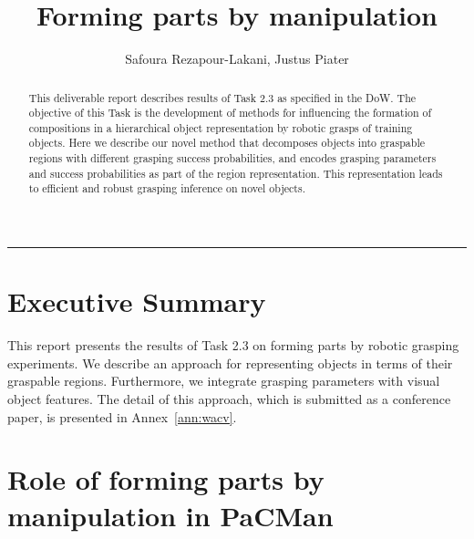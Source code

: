 \documentclass[a4paper,11pt,pdf]{pacmanreport}
\title{Forming parts by manipulation}
\author{Safoura Rezapour-Lakani, Justus Piater}
\begin{document}
\maketitle

\begin{abstract}
\noindent 
This deliverable report describes results of Task 2.3 as specified in
the DoW.  The objective of this Task is the development of methods for
influencing the formation of compositions in a hierarchical object
representation by robotic grasps of training objects.  Here we
describe our novel method that decomposes objects into graspable
regions with different grasping success probabilities,
and encodes grasping parameters and success probabilities as part of
the region representation. This representation leads to efficient and
robust grasping inference on novel objects.

\end{abstract}


\vspace{.2em}
\hrule

\footnotesize

\tableofcontents

\normalsize

\newpage

\section*{Executive Summary}


This report presents the results of Task 2.3 on forming parts by
robotic grasping experiments. We describe an approach for representing
objects in terms of their graspable regions. Furthermore, we integrate
grasping parameters with visual object features. The detail of this
approach, which is submitted as a conference paper, is presented in
Annex~\ref{ann:wacv}.

\section*{Role of forming parts by manipulation in PaCMan}
\end{document}
